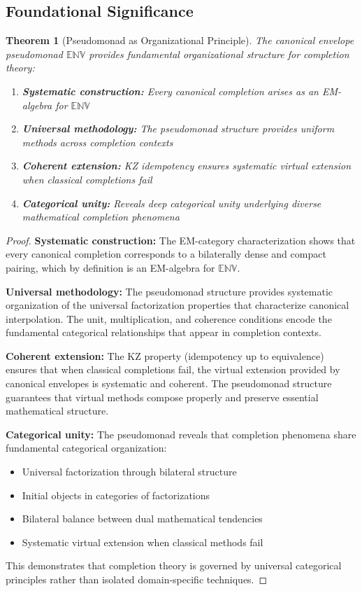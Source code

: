 \documentclass[11pt]{article}
\theoremstyle{plain}
\newtheorem{theorem}{Theorem}[section]
\theoremstyle{definition}
\theoremstyle{remark}
\begin{document}
\subsection{Foundational Significance}

\begin{theorem}[Pseudomonad as Organizational Principle]
The canonical envelope pseudomonad $\mathbb{ENV}$ provides fundamental organizational structure for completion theory:

\begin{enumerate}
\item \textbf{Systematic construction:} Every canonical completion arises as an EM-algebra for $\mathbb{ENV}$

\item \textbf{Universal methodology:} The pseudomonad structure provides uniform methods across completion contexts

\item \textbf{Coherent extension:} KZ idempotency ensures systematic virtual extension when classical completions fail

\item \textbf{Categorical unity:} Reveals deep categorical unity underlying diverse mathematical completion phenomena
\end{enumerate}
\end{theorem}

\begin{proof}
\textbf{Systematic construction:} The EM-category characterization shows that every canonical completion corresponds to a bilaterally dense and compact pairing, which by definition is an EM-algebra for $\mathbb{ENV}$.

\textbf{Universal methodology:} The pseudomonad structure provides systematic organization of the universal factorization properties that characterize canonical interpolation. The unit, multiplication, and coherence conditions encode the fundamental categorical relationships that appear in completion contexts.

\textbf{Coherent extension:} The KZ property (idempotency up to equivalence) ensures that when classical completions fail, the virtual extension provided by canonical envelopes is systematic and coherent. The pseudomonad structure guarantees that virtual methods compose properly and preserve essential mathematical structure.

\textbf{Categorical unity:} The pseudomonad reveals that completion phenomena share fundamental categorical organization:
\begin{itemize}
\item Universal factorization through bilateral structure
\item Initial objects in categories of factorizations
\item Bilateral balance between dual mathematical tendencies
\item Systematic virtual extension when classical methods fail
\end{itemize}

This demonstrates that completion theory is governed by universal categorical principles rather than isolated domain-specific techniques.
\end{proof}
\end{document}
